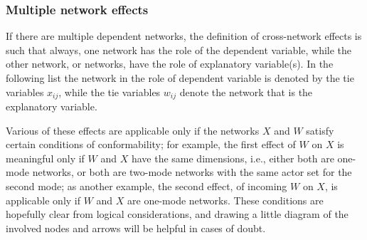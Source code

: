 \documentclass[a4paper,fleqn,11pt]{article}
\newcommand{\+}{\, + \,}
\newcommand{\vit}{\theenumi}
\newcommand{\SI}{{\sf SIENA }}
\begin{document}

\subsubsection{Multiple network effects}
\label{S_MultiNet}

If there are multiple dependent networks, the definition of
cross-network effects is such that always, one network has the
role of the dependent variable, while the other network, or
networks, have the role of explanatory variable(s).
In the following list the network in the role of dependent variable
is denoted by the tie variables $x_{ij}$, while the
tie variables $w_{ij}$ denote the network that is the
explanatory variable.

Various of these effects are applicable only if the networks $X$
and $W$ satisfy certain conditions of conformability; for example,
the first effect of $W$ on $X$ is meaningful only if $W$ and $X$
have the same dimensions, i.e., either both are one-mode networks,
or both are two-mode networks with the same actor set for the second mode;
as another example, the second effect, of incoming $W$ on $X$,
is applicable only if $W$ and $X$ are one-mode networks.
These conditions are hopefully clear from logical considerations,
and drawing a little diagram of the involved nodes and arrows
will be helpful in cases of doubt.
\end{document}
